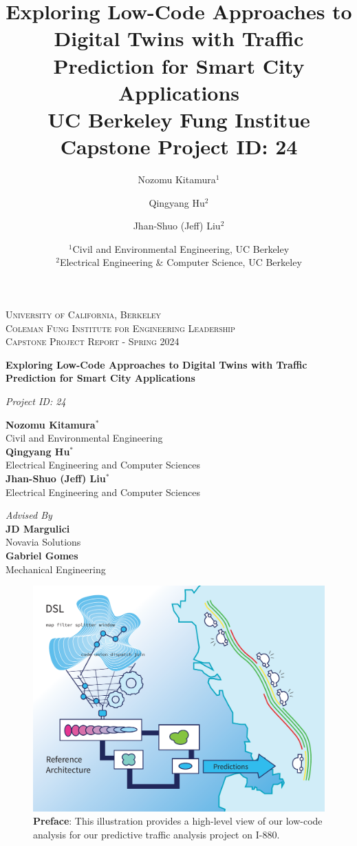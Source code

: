\documentclass[twocolumn]{report}
\title{{\bf Exploring Low-Code Approaches to Digital Twins with Traffic Prediction for Smart City Applications} \\ \medskip \Large UC Berkeley Fung Institue Capstone Project ID: 24}
\author{Nozomu Kitamura$^1$ \and Qingyang Hu$^2$ \and Jhan-Shuo (Jeff) Liu$^2$}
\date{%
    $^1$Civil and Environmental Engineering, UC Berkeley\\%
    $^2$Electrical Engineering \& Computer Science, UC Berkeley\\[1ex]%
}
\begin{document}
\begin{titlepage}
	\centering
    {\scshape\Large University of California, Berkeley \\ Coleman Fung Institute for Engineering Leadership \\ Capstone Project Report - Spring 2024\par}
    \vfill
    
	{\huge\bf Exploring Low-Code Approaches to Digital Twins with Traffic Prediction for Smart City Applications\par}
    \vspace{0.5cm}
    
    {\large {\it Project ID: 24}}
	\vfill
	
	{\Large 
    {\bf Nozomu Kitamura$^*$} \\ Civil and Environmental Engineering \\ \medskip 
    {\bf Qingyang Hu$^*$}  \\ Electrical Engineering and Computer Sciences \\ 
    \medskip 
    {\bf Jhan-Shuo (Jeff) Liu$^*$} \\ Electrical Engineering and Computer Sciences\\}\par

	\vfill
	{\it Advised By} \\ \medskip
	{\bf JD Margulici} \\ Novavia Solutions \\ \medskip
    {\bf Gabriel Gomes} \\ Mechanical Engineering
    


	\vfill
\def\thefootnote{*}\def\thefootnote{\arabic{footnote}}
\end{titlepage}
\newpage

\begin{figure}
    \centering
    \includegraphics[width=\linewidth]{img/illustration.pdf}
    \caption*{{\bf Preface}: This illustration provides a high-level view of our low-code analysis for our predictive traffic analysis project on I-880.}
\end{figure}
\end{document}
